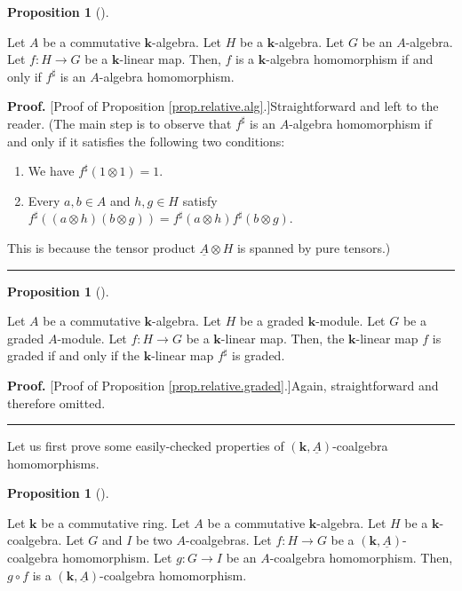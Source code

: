 \documentclass[numbers=enddot,12pt,final,onecolumn,notitlepage,abstracton]{scrartcl}%
\theoremstyle{definition}
\newtheorem{prop}[theo]{Proposition}
\newenvironment{proposition}[1][]
{\begin{prop}[#1]\begin{leftbar}}
{\end{leftbar}\end{prop}}
\newenvironment{proof}[1][Proof]{\noindent\textbf{#1.} }{\ \rule{0.5em}{0.5em}}
\begin{document}
\begin{proposition}
\label{prop.relative.alg}Let $A$ be a commutative $\mathbf{k}$-algebra. Let
$H$ be a $\mathbf{k}$-algebra. Let $G$ be an $A$-algebra. Let $f:H\rightarrow
G$ be a $\mathbf{k}$-linear map. Then, $f$ is a $\mathbf{k}$-algebra
homomorphism if and only if $f^{\sharp}$ is an $A$-algebra homomorphism.
\end{proposition}

\begin{proof}
[Proof of Proposition \ref{prop.relative.alg}.]Straightforward and left to the
reader. (The main step is to observe that $f^{\sharp}$ is an $A$-algebra
homomorphism if and only if it satisfies the following two conditions:

\begin{enumerate}
\item We have $f^{\sharp}\left(  1\otimes1\right)  =1$.

\item Every $a,b\in A$ and $h,g\in H$ satisfy $f^{\sharp}\left(  \left(
a\otimes h\right)  \left(  b\otimes g\right)  \right)  =f^{\sharp}\left(
a\otimes h\right)  f^{\sharp}\left(  b\otimes g\right)  $.
\end{enumerate}

\noindent This is because the tensor product $\underline{A}\otimes H$ is
spanned by pure tensors.)
\end{proof}

\begin{proposition}
\label{prop.relative.graded}Let $A$ be a commutative $\mathbf{k}$-algebra. Let
$H$ be a graded $\mathbf{k}$-module. Let $G$ be a graded $A$-module. Let
$f:H\rightarrow G$ be a $\mathbf{k}$-linear map. Then, the $\mathbf{k}$-linear
map $f$ is graded if and only if the $\mathbf{k}$-linear map $f^{\sharp}$ is graded.
\end{proposition}

\begin{proof}
[Proof of Proposition \ref{prop.relative.graded}.]Again, straightforward and
therefore omitted.
\end{proof}

Let us first prove some easily-checked properties of $\left(  \mathbf{k}%
,\underline{A}\right)  $-coalgebra homomorphisms.

\begin{proposition}
\label{prop.relative.composition.a}Let $\mathbf{k}$ be a commutative ring. Let
$A$ be a commutative $\mathbf{k}$-algebra. Let $H$ be a $\mathbf{k}%
$-coalgebra. Let $G$ and $I$ be two $A$-coalgebras. Let $f:H\rightarrow G$ be
a $\left(  \mathbf{k},\underline{A}\right)  $-coalgebra homomorphism. Let
$g:G\rightarrow I$ be an $A$-coalgebra homomorphism. Then, $g\circ f$ is a
$\left(  \mathbf{k},\underline{A}\right)  $-coalgebra homomorphism.
\end{proposition}
\end{document}
